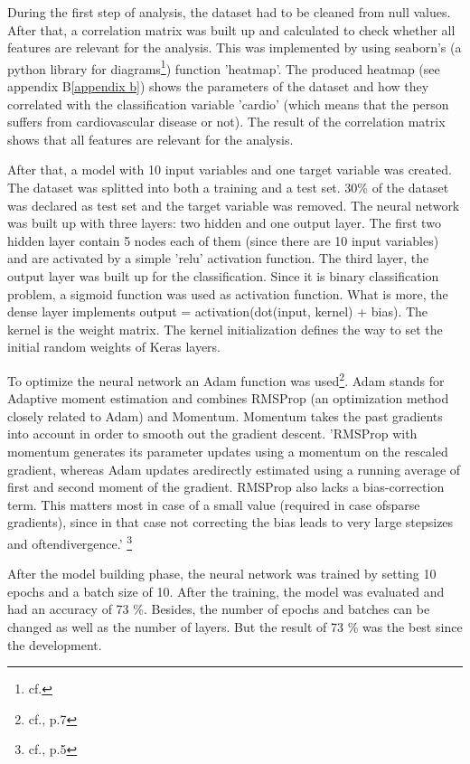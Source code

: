 During the first step of analysis, the dataset had to be cleaned from null values. After that, a correlation matrix was built up and calculated to check whether all features are relevant for the analysis. This was implemented by using seaborn's (a python library for diagrams\footnote{cf.\autocite{seaborn}}) function 'heatmap'. The produced heatmap (see appendix B\ref{appendix b}) shows the parameters of the dataset and how they correlated with the classification variable 'cardio' (which means that the person suffers from cardiovascular disease or not). The result of the correlation matrix shows that all features are relevant for the analysis.

After that, a model with 10 input variables and one target variable was created. The dataset was splitted into both a training and a test set. 30\% of the dataset was declared as test set and the target variable was removed. 
The neural network was built up with three layers: two hidden and one output layer. The first two hidden layer contain 5 nodes each of them (since there are 10 input variables) and are activated by a simple 'relu' activation function. The third layer, the output layer was built up for the classification. Since it is binary classification problem, a sigmoid function was used as activation function. What is more, the dense layer implements output = activation(dot(input, kernel) + bias). The kernel is the weight matrix. The kernel initialization defines the way to set the initial random weights of Keras layers.

To optimize the neural network an Adam function was used\footnote{cf.\autocite{adam}, p.7}. Adam stands for Adaptive moment estimation and combines RMSProp (an optimization method closely related to Adam) and Momentum. Momentum takes the past gradients into account in order to smooth out the gradient descent.
'RMSProp with momentum generates its parameter updates using a momentum on the rescaled gradient, whereas Adam updates aredirectly estimated using a running average of first and second moment of the gradient. RMSProp also lacks a bias-correction term. This matters most in case of a small value \textbeta (required in case ofsparse gradients), since in that case not correcting the bias leads to very large stepsizes and oftendivergence.' \footnote{cf.\autocite{adam}, p.5}

After the model building phase, the neural network was trained by setting 10 epochs and a batch size of 10. 
After the training, the model was evaluated and had an accuracy of 73 \%. 
Besides, the number of epochs and batches can be changed as well as the number of layers. But the result of 73 \% was the best since the development.

